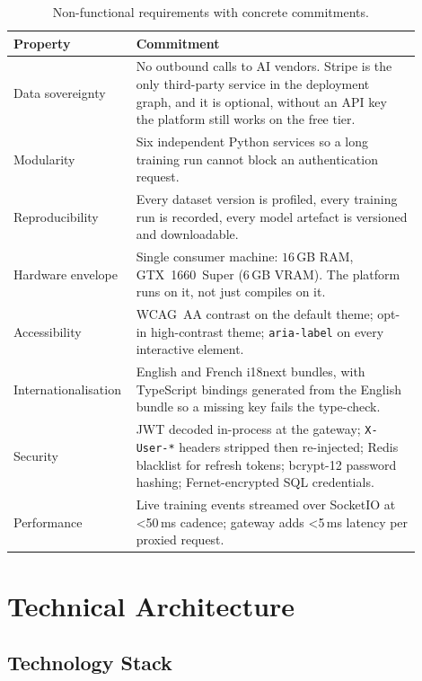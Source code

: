 \documentclass[12pt, a4paper, oneside]{report}
\begin{document}
\begin{table}[H]
\centering
\caption{Non-functional requirements with concrete commitments.}
\label{tab:nonfunctional_reqs}
\begin{tabular}{|p{0.22\linewidth}|L{0.68\linewidth}|}
\hline
\textbf{Property} & \textbf{Commitment} \\
\hline
Data sovereignty & No outbound calls to AI vendors. Stripe is the only third-party service in the deployment graph, and it is optional, without an API key the platform still works on the free tier. \\ \hline
Modularity & Six independent Python services so a long training run cannot block an authentication request. \\ \hline
Reproducibility & Every dataset version is profiled, every training run is recorded, every model artefact is versioned and downloadable. \\ \hline
Hardware envelope & Single consumer machine: $16$\,GB RAM, GTX~1660~Super (6\,GB VRAM). The platform runs on it, not just compiles on it. \\ \hline
Accessibility & WCAG~AA contrast on the default theme; opt-in high-contrast theme; \texttt{aria-label} on every interactive element. \\ \hline
Internationalisation & English and French i18next bundles, with TypeScript bindings generated from the English bundle so a missing key fails the type-check. \\ \hline
Security & JWT decoded in-process at the gateway; \texttt{X-User-*} headers stripped then re-injected; Redis blacklist for refresh tokens; bcrypt-12 password hashing; Fernet-encrypted SQL credentials. \\ \hline
Performance & Live training events streamed over SocketIO at \textless50\,ms cadence; gateway adds \textless5\,ms latency per proxied request. \\
\hline
\end{tabular}
\end{table}

\section{Technical Architecture}

\subsection{Technology Stack}
\end{document}
